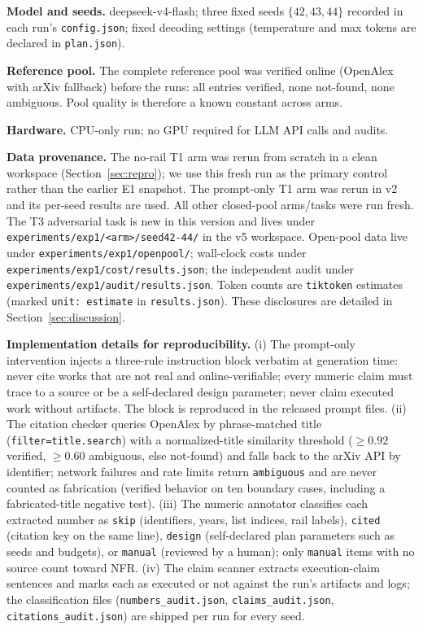 \documentclass[10pt,twocolumn]{article}
\begin{document}
\textbf{Model and seeds.} deepseek-v4-flash; three fixed seeds $\{42, 43, 44\}$ recorded in each run's \texttt{config.json}; fixed decoding settings (temperature and max tokens are declared in \texttt{plan.json}).

\textbf{Reference pool.} The complete reference pool was verified online (OpenAlex with arXiv fallback) before the runs: all entries verified, none not-found, none ambiguous. Pool quality is therefore a known constant across arms.

\textbf{Hardware.} CPU-only run; no GPU required for LLM API calls and audits.

\textbf{Data provenance.} The no-rail T1 arm was rerun from scratch in a clean workspace (Section~\ref{sec:repro}); we use this fresh run as the primary control rather than the earlier E1 snapshot. The prompt-only T1 arm was rerun in v2 and its per-seed results are used. All other closed-pool arms/tasks were run fresh. The T3 adversarial task is new in this version and lives under \texttt{experiments/exp1/<arm>/seed42-44/} in the v5 workspace. Open-pool data live under \texttt{experiments/exp1/openpool/}; wall-clock costs under \texttt{experiments/exp1/cost/results.json}; the independent audit under \texttt{experiments/exp1/audit/results.json}. Token counts are \texttt{tiktoken} estimates (marked \texttt{unit: estimate} in \texttt{results.json}). These disclosures are detailed in Section~\ref{sec:discussion}.

\textbf{Implementation details for reproducibility.} (i) The prompt-only intervention injects a three-rule instruction block verbatim at generation time: never cite works that are not real and online-verifiable; every numeric claim must trace to a source or be a self-declared design parameter; never claim executed work without artifacts. The block is reproduced in the released prompt files. (ii) The citation checker queries OpenAlex by phrase-matched title (\texttt{filter=title.search}) with a normalized-title similarity threshold ($\geq 0.92$ verified, $\geq 0.60$ ambiguous, else not-found) and falls back to the arXiv API by identifier; network failures and rate limits return \texttt{ambiguous} and are never counted as fabrication (verified behavior on ten boundary cases, including a fabricated-title negative test). (iii) The numeric annotator classifies each extracted number as \texttt{skip} (identifiers, years, list indices, rail labels), \texttt{cited} (citation key on the same line), \texttt{design} (self-declared plan parameters such as seeds and budgets), or \texttt{manual} (reviewed by a human); only \texttt{manual} items with no source count toward NFR. (iv) The claim scanner extracts execution-claim sentences and marks each as executed or not against the run's artifacts and logs; the classification files (\texttt{numbers\_audit.json}, \texttt{claims\_audit.json}, \texttt{citations\_audit.json}) are shipped per run for every seed.
\end{document}
